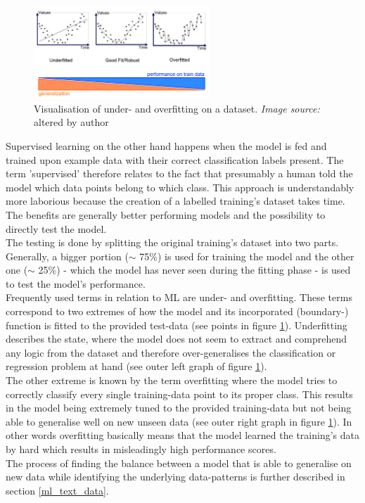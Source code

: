 \begin{figure}
   \centering
   \includegraphics[width=0.59\textwidth]{img/over_underfitting}
   \caption{Visualisation of under- and overfitting on a dataset. \textit{Image source:} \parencite{Bhande2018} altered by author}
   \label{fig:over_underfitting}
\end{figure}

Supervised learning on the other hand happens when the model is fed and trained upon example data with their correct classification labels present. The term 'supervised' therefore relates to the fact that presumably a human told the model which data points belong to which class. This approach is understandably more laborious because the creation of a labelled training's dataset takes time. The benefits are generally better performing models and the possibility to directly test the model. \\
The testing is done by splitting the original training's dataset into two parts. Generally, a bigger portion ($\sim$ 75\%) is used for training the model and the other one ($\sim$ 25\%) - which the model has never seen during the fitting phase - is used to test the model's performance. \\
\newline
Frequently used terms in relation to ML are under- and overfitting. These terms correspond to two extremes of how the model and its incorporated (boundary-) function is fitted to the provided test-data (see points in figure \ref{fig:over_underfitting}). Underfitting describes the state, where the model does not seem to extract and comprehend any logic from the dataset and therefore over-generalises the classification or regression problem at hand (see outer left graph of figure \ref{fig:over_underfitting}). \\
The other extreme is known by the term overfitting where the model tries to correctly classify every single training-data point to its proper class. This results in the model being extremely tuned to the provided training-data but not being able to generalise well on new unseen data (see outer right graph in figure \ref{fig:over_underfitting}). In other words overfitting basically means that the model learned the training's data by hard which results in misleadingly high performance scores. \\
The process of finding the balance between a model that is able to generalise on new data while identifying the underlying data-patterns is further described in section \ref{ml_text_data}.

